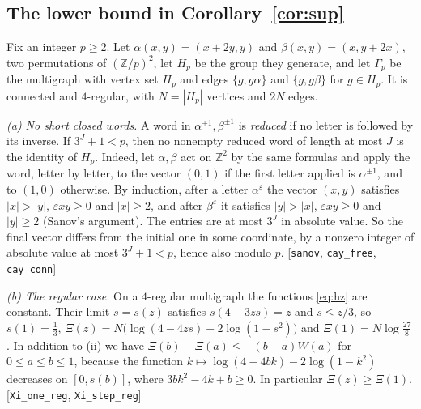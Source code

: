 \documentclass[11pt]{amsart}
\theoremstyle{plain}
\theoremstyle{remark}
\newcommand{\code}[1]{\texttt{#1}}
\begin{document}
\subsection*{The lower bound in Corollary~\ref{cor:sup}}
Fix an integer $p\ge2$. Let $\alpha(x,y)=(x+2y,y)$ and $\beta(x,y)=(x,y+2x)$, two permutations of
$(\mathbb{Z}/p)^2$, let $H_p$ be the group they generate, and let $\Gamma_p$ be the multigraph with vertex set
$H_p$ and edges $\{g,g\alpha\}$ and $\{g,g\beta\}$ for $g\in H_p$. It is connected and $4$-regular, with
$N=|H_p|$ vertices and $2N$ edges.

\smallskip\noindent\emph{(a) No short closed words.} A word in $\alpha^{\pm1},\beta^{\pm1}$ is \emph{reduced} if
no letter is followed by its inverse. If $3^J+1<p$, then no nonempty reduced word of length at most $J$ is the
identity of $H_p$. Indeed, let $\alpha,\beta$ act on $\mathbb{Z}^2$ by the same formulas and apply the word, letter
by letter, to the vector $(0,1)$ if the first letter applied is $\alpha^{\pm1}$, and to $(1,0)$ otherwise. By
induction, after a letter $\alpha^{\varepsilon}$ the vector $(x,y)$ satisfies $|x|>|y|$, $\varepsilon xy\ge0$ and
$|x|\ge2$, and after $\beta^{\varepsilon}$ it satisfies $|y|>|x|$, $\varepsilon xy\ge0$ and $|y|\ge2$ (Sanov's
argument). The entries are at most $3^J$ in absolute value. So the final vector differs from the initial one in
some coordinate, by a nonzero integer of absolute value at most $3^J+1<p$, hence also modulo $p$.
[\code{sanov}, \code{cay\_free}, \code{cay\_conn}]

\smallskip\noindent\emph{(b) The regular case.} On a $4$-regular multigraph the functions \eqref{eq:hz} are
constant. Their limit $s=s(z)$ satisfies $s(4-3zs)=z$ and $s\le z/3$, so $s(1)=\frac13$,
$\Xi(z)=N\bigl(\log(4-4zs)-2\log(1-s^2)\bigr)$ and $\Xi(1)=N\log\frac{27}8$. In addition to (ii) we have
$\Xi(b)-\Xi(a)\le-(b-a)W(a)$ for $0\le a\le b\le1$, because the function
$k\mapsto\log(4-4bk)-2\log(1-k^2)$ decreases on $[0,s(b)]$, where $3bk^2-4k+b\ge0$. In particular
$\Xi(z)\ge\Xi(1)$. [\code{Xi\_one\_reg}, \code{Xi\_step\_reg}]
\end{document}
